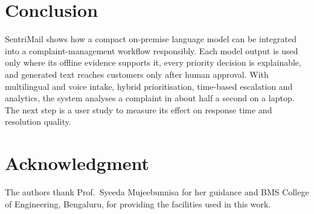 \documentclass[conference]{IEEEtran}
\begin{document}
\section{Conclusion}
SentriMail shows how a compact on-premise language model can be integrated into a complaint-management workflow responsibly. Each model output is used only where its offline evidence supports it, every priority decision is explainable, and generated text reaches customers only after human approval. With multilingual and voice intake, hybrid prioritisation, time-based escalation and analytics, the system analyses a complaint in about half a second on a laptop. The next step is a user study to measure its effect on response time and resolution quality.

\section*{Acknowledgment}
The authors thank Prof.\ Syeeda Mujeebunnisa for her guidance and BMS College of Engineering, Bengaluru, for providing the facilities used in this work.

\balance


\end{document}
